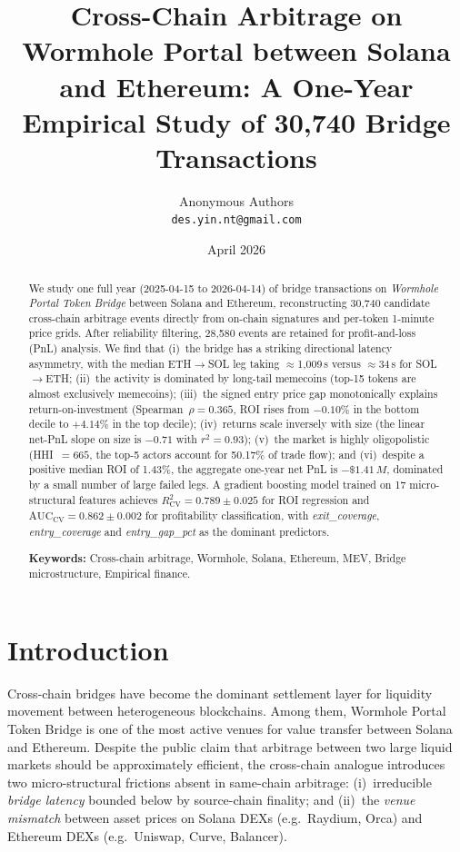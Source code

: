 \documentclass[11pt,a4paper]{article}
\title{\textbf{Cross-Chain Arbitrage on Wormhole Portal between Solana and Ethereum: A One-Year Empirical Study of 30{,}740 Bridge Transactions}}
\author{Anonymous Authors\\\small\texttt{des.yin.nt@gmail.com}}
\date{April 2026}
\begin{document}
\maketitle

\begin{abstract}
We study one full year (2025-04-15 to 2026-04-14) of bridge transactions on
\emph{Wormhole Portal Token Bridge} between Solana and Ethereum, reconstructing
30{,}740 candidate cross-chain arbitrage events directly from on-chain
signatures and per-token 1-minute price grids. After reliability filtering,
28{,}580 events are retained for profit-and-loss (PnL) analysis. We find that
(i)~the bridge has a striking directional latency asymmetry, with the median
ETH$\to$SOL leg taking $\approx$1{,}009\,s versus $\approx$34\,s for
SOL$\to$ETH; (ii)~the activity is dominated by long-tail memecoins (top-15
tokens are almost exclusively memecoins); (iii)~the signed entry price gap
monotonically explains return-on-investment (Spearman~$\rho=0.365$, ROI rises
from $-0.10\%$ in the bottom decile to $+4.14\%$ in the top decile);
(iv)~returns scale inversely with size (the linear net-PnL slope on size is
$-0.71$ with $r^{2}=0.93$); (v)~the market is highly oligopolistic
(HHI~$=665$, the top-5 actors account for 50.17\% of trade flow); and
(vi)~despite a positive median ROI of 1.43\%, the aggregate one-year net PnL is
$-\$1.41\,M$, dominated by a small number of large failed legs. A gradient
boosting model trained on 17 micro-structural features achieves
\textbf{$R^{2}_{\text{CV}}=0.789\pm0.025$} for ROI regression and
\textbf{$\text{AUC}_{\text{CV}}=0.862\pm0.002$} for profitability
classification, with \emph{exit\_coverage}, \emph{entry\_coverage} and
\emph{entry\_gap\_pct} as the dominant predictors.

\medskip
\noindent\textbf{Keywords:} Cross-chain arbitrage, Wormhole, Solana, Ethereum,
MEV, Bridge microstructure, Empirical finance.
\end{abstract}

\section{Introduction}\label{sec:intro}

Cross-chain bridges have become the dominant settlement layer for liquidity
movement between heterogeneous blockchains. Among them, Wormhole Portal Token
Bridge is one of the most active venues for value transfer between Solana and
Ethereum. Despite the public claim that arbitrage between two large liquid
markets should be approximately efficient, the cross-chain analogue introduces
two micro-structural frictions absent in same-chain arbitrage: (i)~irreducible
\emph{bridge latency} bounded below by source-chain finality; and (ii)~the
\emph{venue mismatch} between asset prices on Solana DEXs (e.g.\ Raydium,
Orca) and Ethereum DEXs (e.g.\ Uniswap, Curve, Balancer).
\end{document}
